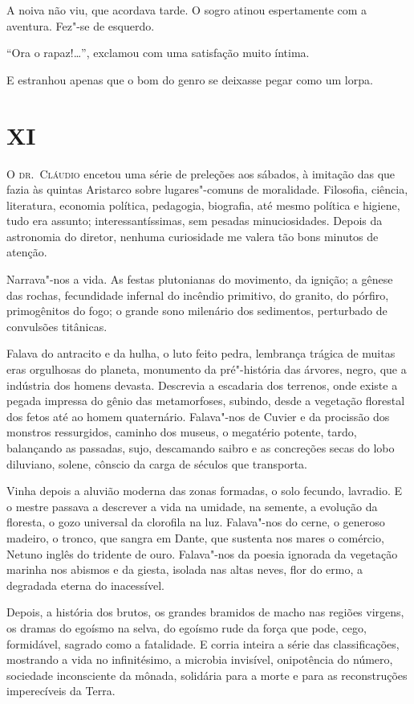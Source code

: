 A noiva não viu, que acordava tarde. O sogro atinou espertamente com a
aventura. Fez"-se de esquerdo. 

``Ora o rapaz!\ldots{}'', exclamou com uma satisfação muito íntima. 

E estranhou apenas que o bom do genro se
deixasse pegar como um lorpa.

\section{XI}

\noindent\textsc{O dr.~Cláudio} encetou uma série de preleções aos sábados, à imitação das
que fazia às quintas Aristarco sobre lugares"-comuns de moralidade.
Filosofia, ciência, literatura, economia política, pedagogia,
biografia, até mesmo política e higiene, tudo era assunto;
interessantíssimas, sem pesadas minuciosidades. Depois da astronomia do
diretor, nenhuma curiosidade me valera tão bons minutos de atenção.

Narrava"-nos a vida. As festas plutonianas do movimento, da ignição; a
gênese das rochas, fecundidade infernal do incêndio primitivo, do
granito, do pórfiro, primogênitos do fogo; o grande sono milenário dos
sedimentos, perturbado de convulsões titânicas. 

Falava do antracito e
da hulha, o luto feito pedra, lembrança trágica de muitas eras
orgulhosas do planeta, monumento da pré"-história das árvores, negro,
que a indústria dos homens devasta. Descrevia a escadaria dos terrenos,
onde existe a pegada impressa do gênio das metamorfoses, subindo, desde
a vegetação florestal dos fetos até ao homem quaternário. Falava"-nos
de Cuvier e da procissão dos monstros ressurgidos, caminho dos museus,
o megatério potente, tardo, balançando as passadas, sujo, descamando
saibro e as concreções secas do lobo diluviano, solene, cônscio da
carga de séculos que transporta.

Vinha depois a aluvião moderna das zonas formadas, o solo fecundo,
lavradio. E o mestre passava a descrever a vida na umidade, na semente,
a evolução da floresta, o gozo universal da clorofila na luz.
Falava"-nos do cerne, o generoso madeiro, o tronco, que sangra em
Dante, que sustenta nos mares o comércio, Netuno inglês do tridente de
ouro. Falava"-nos da poesia ignorada da vegetação marinha nos abismos
e da giesta, isolada nas altas neves, flor do ermo, a degradada eterna
do inacessível. 

Depois, a história dos brutos, os grandes bramidos de
macho nas regiões virgens, os dramas do egoísmo na selva, do egoísmo
rude da força que pode, cego, formidável, sagrado como a fatalidade. E
corria inteira a série das classificações, mostrando a vida no
infinitésimo, a microbia invisível, onipotência do número, sociedade
inconsciente da mônada, solidária para a morte e para as reconstruções
imperecíveis da Terra. 

